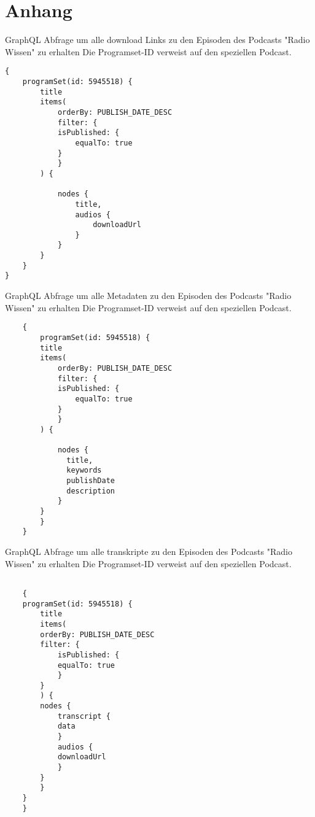 \chapter{Anhang}\label{app:supplemental-information}


\label{graphql-1}
GraphQL Abfrage um alle download Links zu den Episoden des Podcasts "Radio Wissen" zu erhalten
Die Programset-ID verweist auf den speziellen Podcast.

\begin{verbatim}
{
    programSet(id: 5945518) {
        title
        items(
            orderBy: PUBLISH_DATE_DESC
            filter: {
            isPublished: {
                equalTo: true
            }
            }
        ) {
            
            nodes {
                title,
                audios {
                    downloadUrl
                }
            }
        }
    }
}

\end{verbatim}

\label{ch:graphql-2}
GraphQL Abfrage um alle Metadaten zu den Episoden des Podcasts "Radio Wissen" zu erhalten
Die Programset-ID verweist auf den speziellen Podcast.

\begin{verbatim}
    {
        programSet(id: 5945518) {
        title
        items(
            orderBy: PUBLISH_DATE_DESC
            filter: {
            isPublished: {
                equalTo: true
            }
            }
        ) {
          	
            nodes {
              title,
              keywords
              publishDate
              description
            }
        }
        }
    }

\end{verbatim}

\label{ch:graphql-3}
GraphQL Abfrage um alle transkripte zu den Episoden des Podcasts "Radio Wissen" zu erhalten
Die Programset-ID verweist auf den speziellen Podcast.

\begin{verbatim}

    {
    programSet(id: 5945518) {
        title
        items(
        orderBy: PUBLISH_DATE_DESC
        filter: {
            isPublished: {
            equalTo: true
            }
        }
        ) {
        nodes {
            transcript {
            data
            }
            audios {
            downloadUrl
            }
        }
        }
    }
    }
\end{verbatim}

